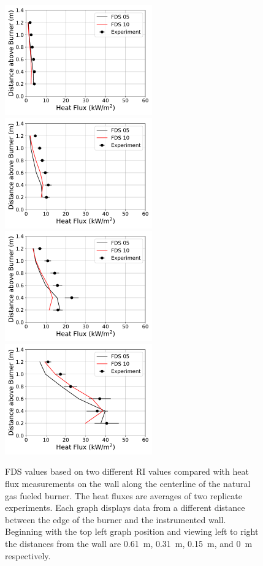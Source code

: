 \documentclass[twoside]{uocthesis}
\begin{document}
{\begin{figure}[ht!]
  \centering
  \includegraphics[width=2.5in]{../Figures/IWGB_NG_HF_Center_Avg_2D_RI}
  \includegraphics[width=2.5in]{../Figures/IWGB_NG_HF_Center_Avg_1D_RI}\\
  \includegraphics[width=2.5in]{../Figures/IWGB_NG_HF_Center_Avg_0p5D_RI}
  \includegraphics[width=2.5in]{../Figures/IWGB_NG_HF_Center_Avg_0D_RI}\\
  \caption[FDS values based on two different RI values compared with heat flux measurements on the wall along the centerline of the natural gas fueled burner.]{FDS values based on two different RI values compared with heat flux measurements on the wall along the centerline of the natural gas fueled burner. The heat fluxes are averages of two replicate experiments. Each graph displays data from a different distance between the edge of the burner and the instrumented wall.  Beginning with the top left graph position and viewing left to right the distances from the wall are 0.61~m, 0.31~m, 0.15~m, and 0~m respectively.}
  \label{FDS_HFCL_IWNG_comp}
\end{figure}

}
\end{document}
